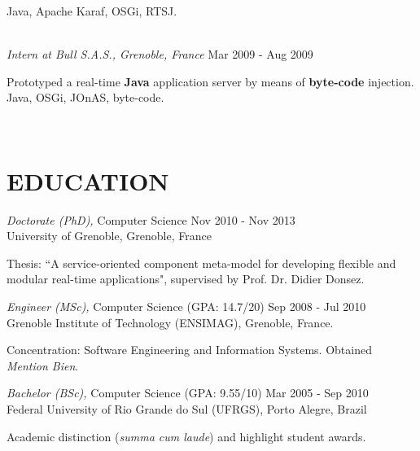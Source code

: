 \documentclass[margin]{res}
\begin{document}
\begin{resume}
\begin{small}
				{\color{gray}Java, Apache Karaf, OSGi, RTSJ.}
	                 \end{small}
			\vspace{1mm}\\                 
                		{\sl Intern at Bull S.A.S., Grenoble, France} \hfill Mar 2009 - Aug 2009 \\
	                \begin{small}
                			{\color{darkgray} Prototyped a real-time \textbf{Java} application server by means of \textbf{byte-code} injection.}\\
				{\color{gray}Java, OSGi, JOnAS, byte-code.}
        		        \end{small}
                		\vspace{1mm}\\                 
		\vspace{-8mm}
		\section{EDUCATION} {\sl Doctorate (PhD),} Computer Science \hfill Nov 2010 - Nov 2013\\
               		University of Grenoble, Grenoble, France\\
	   		\begin{small}
        	        			{\color{darkgray} Thesis: ``A service-oriented component meta-model for developing flexible and modular real-time applications", supervised by Prof. Dr. Didier Donsez.}
				\vspace{1.5mm}\\                 	            
			\end{small}  	            
        		        {\sl Engineer (MSc),} Computer Science (GPA: 14.7/20) \hfill Sep 2008 - Jul 2010\\
               		Grenoble Institute of Technology (ENSIMAG), Grenoble, France.\\
	               	 \begin{small}
        		       		{\color{darkgray} Concentration: Software Engineering and Information Systems. Obtained \textit{Mention Bien}.}
				\vspace{1.5mm}\\
	               	\end{small}
        		        {\sl Bachelor (BSc),} Computer Science (GPA: 9.55/10) \hfill Mar 2005 - Sep 2010\\
                		Federal University of Rio Grande do Sul (UFRGS), Porto Alegre, Brazil\\
	               	\begin{small}
        		       		{\color{darkgray} Academic distinction (\textit{summa cum laude}) and highlight student awards.}
				\vspace{1.5mm}\\
	               	\end{small}
		\vspace{-8mm}

\end{resume}
\end{document}
